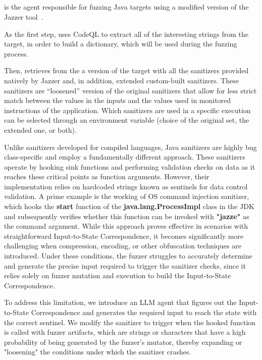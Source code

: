 \subsection{\jazzmine}

\jazzmine is the agent responsible for fuzzing Java targets using a modified version of the Jazzer tool~\cite{jazzer}.

As the first step, \jazzmine uses CodeQL to extract all of the interesting strings from the target, in order to build a dictionary, which will be used during the fuzzing process.

Then, \jazzmine retrieves from the \builder a version of the target with all the sanitizers provided natively by Jazzer and, in addition, extended custom-built sanitizers.
These sanitizers are ``loosened'' version of the original sanitizers that allow for less strict match between the values in the inputs and the values used in monitored instructions of the application.
Which sanitizers are used in a specific execution can be selected through an environment variable (choice of the original set, the extended one, or both).

Unlike sanitizers developed for compiled languages, Java sanitizers are highly bug class-specific and employ a fundamentally different approach. These sanitizers operate by hooking sink functions and performing validation checks on data as it reaches these critical points as function arguments. However, their implementation relies on hardcoded strings known as sentinels for data control validation. A prime example is the working of OS command injection sanitizer, which hooks the \textbf{start} function of the \textbf{java.lang.ProcessImpl} class in the JDK and subsequently verifies whether this function can be invoked with \textbf{"jazze"} as the command argument. While this approach proves effective in scenarios with straightforward Input-to-State Correspondence, it becomes significantly more challenging when compression, encoding, or other obfuscation techniques are introduced. Under these conditions, the fuzzer struggles to accurately determine and generate the precise input required to trigger the sanitizer checks, since it relies solely on fuzzer mutation and execution to build the Input-to-State Correspondence. 

To address this limitation, we introduce an LLM agent that figures out the Input-to-State Correspondence and generates the required input to reach the state with the correct sentinel.  We modify the sanitizer to trigger when the hooked function is called with fuzzer artifacts, which are strings or characters that have a high probability of being generated by the fuzzer's mutator, thereby expanding or "loosening" the conditions under which the sanitizer crashes.

